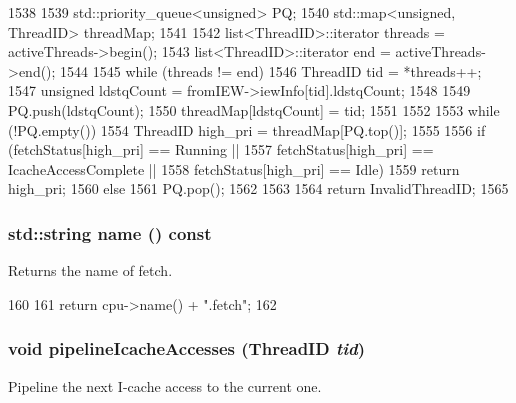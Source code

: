 \begin{DoxyCode}
1538 {
1539     std::priority_queue<unsigned> PQ;
1540     std::map<unsigned, ThreadID> threadMap;
1541 
1542     list<ThreadID>::iterator threads = activeThreads->begin();
1543     list<ThreadID>::iterator end = activeThreads->end();
1544 
1545     while (threads != end) {
1546         ThreadID tid = *threads++;
1547         unsigned ldstqCount = fromIEW->iewInfo[tid].ldstqCount;
1548 
1549         PQ.push(ldstqCount);
1550         threadMap[ldstqCount] = tid;
1551     }
1552 
1553     while (!PQ.empty()) {
1554         ThreadID high_pri = threadMap[PQ.top()];
1555 
1556         if (fetchStatus[high_pri] == Running ||
1557             fetchStatus[high_pri] == IcacheAccessComplete ||
1558             fetchStatus[high_pri] == Idle)
1559             return high_pri;
1560         else
1561             PQ.pop();
1562     }
1563 
1564     return InvalidThreadID;
1565 }
\end{DoxyCode}
\hypertarget{classDefaultFetch_a37627d5d5bba7f4a8690c71c2ab3cb07}{
\subsubsection[{name}]{\setlength{\rightskip}{0pt plus 5cm}std::string name () const}}
\label{classDefaultFetch_a37627d5d5bba7f4a8690c71c2ab3cb07}
Returns the name of fetch. 


\begin{DoxyCode}
160 {
161     return cpu->name() + ".fetch";
162 }
\end{DoxyCode}
\hypertarget{classDefaultFetch_a80cf75d186616b207a78a162498d1012}{
\subsubsection[{pipelineIcacheAccesses}]{\setlength{\rightskip}{0pt plus 5cm}void pipelineIcacheAccesses ({\bf ThreadID} {\em tid})}}
\label{classDefaultFetch_a80cf75d186616b207a78a162498d1012}
Pipeline the next I-\/cache access to the current one. 


